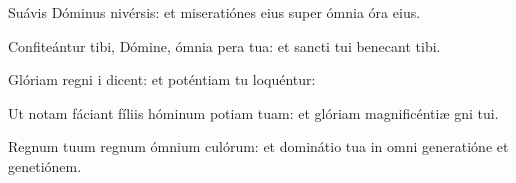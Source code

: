 \item {}

\item Suávis Dóminus nivérsis:\psstar{} et miseratiónes eius super ómnia óra eius.

\item Confiteántur tibi, Dómine, ómnia pera tua:\psstar{} et sancti tui benecant tibi.

\item Glóriam regni i dicent:\psstar{} et poténtiam tu loquéntur:

\item Ut notam fáciant fíliis hóminum potiam tuam:\psstar{} et glóriam magnificéntiæ gni tui.

\item Regnum tuum regnum ómnium culórum:\psstar{} et dominátio tua in omni generatióne et genetiónem.


